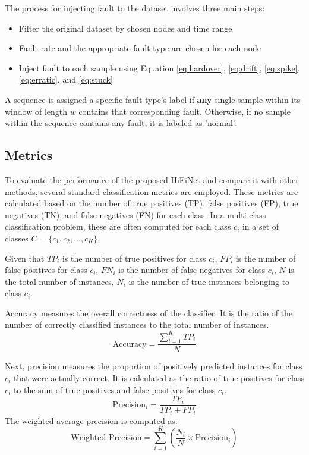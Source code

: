 The process for injecting fault to the dataset involves three main steps:
\begin{itemize}
  \item Filter the original dataset by chosen nodes and time range
  \item Fault rate and the appropriate fault type are chosen for each node
  \item Inject fault to each sample using Equation \ref{eq:hardover}, \ref{eq:drift}, \ref{eq:spike}, \ref{eq:erratic}, and \ref{eq:stuck}
\end{itemize}
A sequence is assigned a specific fault type's label if \textbf{any} single sample within its window of length \(w\) contains that corresponding fault. Otherwise, if no sample within the sequence contains any fault, it is labeled as 'normal'.

\subsection{Metrics}
To evaluate the performance of the proposed HiFiNet and compare it with other methods, several standard classification metrics are employed. These metrics are calculated based on the number of true positives (TP), false positives (FP), true negatives (TN), and false negatives (FN) for each class. In a multi-class classification problem, these are often computed for each class $c_i$ in a set of classes $C = \{c_1, c_2, \dots, c_K\}$.

Given that \(TP_i\) is the number of true positives for class \(c_i\), \(FP_i\) is the number of false positives for class \(c_i\), \(FN_i\) is the number of false negatives for class \(c_i\), \(N\) is the total number of instances, \(N_i\) is the number of true instances belonging to class \(c_i\).

Accuracy measures the overall correctness of the classifier. It is the ratio of the number of correctly classified instances to the total number of instances.
\begin{equation}
  \text{Accuracy} = \frac{\sum_{i=1}^{K} TP_i}{N}
\end{equation}

Next, precision measures the proportion of positively predicted instances for class \(c_i\) that were actually correct. It is calculated as the ratio of true positives for class \(c_i\) to the sum of true positives and false positives for class \(c_i\).
\begin{equation}
  \text{Precision}_i = \frac{TP_i}{TP_i + FP_i}
\end{equation}
The weighted average precision is computed as:
\begin{equation}
  \text{Weighted Precision} = \sum_{i=1}^{K} \left( \frac{N_i}{N} \times \text{Precision}_i \right)
\end{equation}

